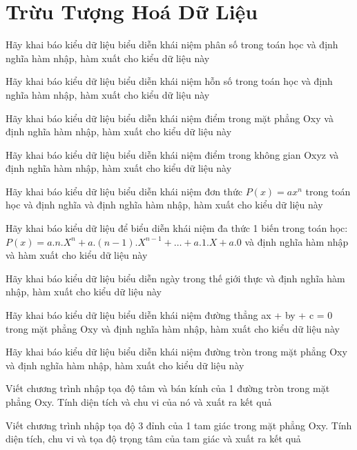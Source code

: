 \chapter{Trừu Tượng Hoá Dữ Liệu}
\hypertarget{localtoc\thechapter}{}
\localtoc

\begin{problem}
    Hãy khai báo kiểu dữ liệu biểu diễn khái niệm phân số trong toán học và định nghĩa hàm nhập, hàm xuất cho kiểu dữ liệu này
\end{problem}
\begin{problem}
    Hãy khai báo kiểu dữ liệu biểu diễn khái niệm hỗn số trong toán học và định nghĩa hàm nhập, hàm xuất cho kiểu dữ liệu này
\end{problem}
\begin{problem}
    Hãy khai báo kiểu dữ liệu biểu diễn khái niệm điểm trong mặt phẳng Oxy và định nghĩa hàm nhập, hàm xuất cho kiểu dữ liệu này
\end{problem}
\begin{problem}
    Hãy khai báo kiểu dữ liệu biểu diễn khái niệm điểm trong không gian Oxyz và định nghĩa hàm nhập, hàm xuất cho kiểu dữ liệu này
\end{problem}
\begin{problem}
    Hãy khai báo kiểu dữ liệu biểu diễn khái niệm đơn thức $P(x) = ax^n$ trong toán học và định nghĩa và định nghĩa hàm nhập, hàm xuất cho kiểu dữ liệu này
\end{problem}
\begin{problem}
    Hãy khai báo kiểu dữ liệu để biểu diễn khái niệm đa thức 1 biến trong toán học: $P(x) = a.n.X^n + a.(n-1).X^{n-1} + … + a.1.X + a.0$ và định nghĩa hàm nhập và hàm xuất cho kiểu dữ liệu này
\end{problem}
\begin{problem}
    Hãy khai báo kiểu dữ liệu biểu diễn ngày trong thế giới thực và định nghĩa hàm nhập, hàm xuất cho kiểu dữ liệu này
\end{problem}
\begin{problem}
    Hãy khai báo kiểu dữ liệu biểu diễn khái niệm đường thẳng ax + by + c = 0 trong mặt phẳng Oxy và định nghĩa hàm nhập, hàm xuất cho kiểu dữ liệu này
\end{problem}
\begin{problem}
    Hãy khai báo kiểu dữ liệu biểu diễn khái niệm đường tròn trong mặt phẳng Oxy và định nghĩa hàm nhập, hàm xuất cho kiểu dữ liệu này
\end{problem}
\begin{problem}
    Viết chương trình nhập tọa độ tâm và bán kính của 1 đường tròn trong mặt phẳng Oxy. Tính diện tích và chu vi của nó và xuất ra kết quả
\end{problem}
\begin{problem}
     Viết chương trình nhập tọa độ 3 đỉnh của 1 tam giác trong mặt phẳng Oxy. Tính diện tích, chu vi và tọa độ trọng tâm của tam giác và xuất ra kết quả
\end{problem}

